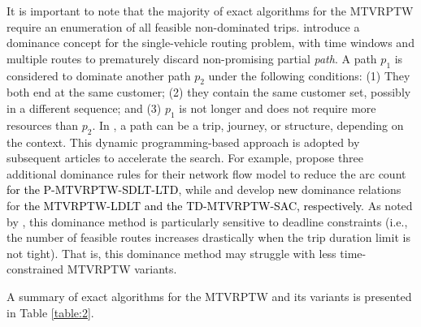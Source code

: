 \documentclass[11pt]{article}
\newcommand\addb[1]{\textcolor{black}{#1}}
\begin{document}
It is important to note that the majority of exact algorithms for the MTVRPTW require an enumeration of all feasible non-dominated trips.  \cite{azi2007exact} introduce a dominance concept for the single-vehicle routing problem, with time windows and multiple routes to prematurely discard non-promising partial \textit{path}.  A path $p_1$ is considered to dominate another path $p_2$ under the following conditions: (1) They both end at the same customer; (2) they contain the same customer set, possibly in a different sequence; and (3) $p_1$ is not longer and does not require more resources than $p_2$.  In \cite{azi2007exact}, a path can be a trip, journey, or structure, depending on the context.  This dynamic programming-based approach is adopted by subsequent articles to accelerate the search.  For example, \cite{macedo2011solving} propose three additional dominance rules for their network flow model to reduce the arc count \addb{for the P-MTVRPTW-SDLT-LTD}, while \cite{hernandez2016branch} and \cite{christiansen2017operational} develop \addb{new} dominance relations for \addb{the MTVRPTW-LDLT and the TD-MTVRPTW-SAC, respectively}.  As noted by \cite{azi2007exact}, this dominance method is particularly sensitive to deadline constraints (i.e., the number of feasible routes increases drastically when the trip duration limit is not tight).  That is, this dominance method may struggle with less time-constrained MTVRPTW variants.
\newline

A summary of exact algorithms for the MTVRPTW and its variants is presented in Table \ref{table:2}.
\end{document}
